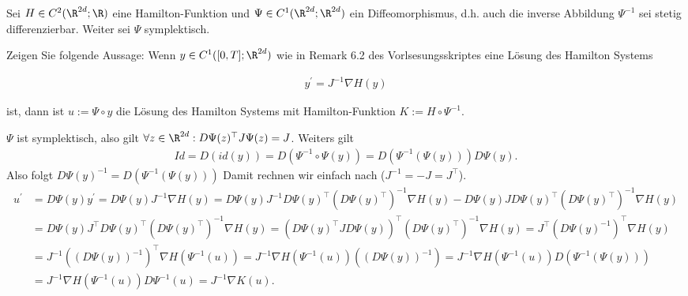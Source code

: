 \begin{exercise}
  Sei $H \in C^2(\R^{2d};\R)$ eine Hamilton-Funktion und
  $\Psi \in C^1(\R^{2d};\R^{2d})$ ein Diffeomorphismus,
  d.h. auch die inverse Abbildung $\Psi^{-1}$ sei stetig
  differenzierbar. Weiter sei $\Psi$ symplektisch.

  Zeigen Sie folgende Aussage: Wenn $y \in C^1([0,T];\R^{2d})$
  wie in Remark 6.2 des Vorlsesungsskriptes eine Lösung des
  Hamilton Systems

  \begin{align}
    y^\prime = J^{-1}\nabla H(y)
  \end{align}

  ist, dann ist $u := \Psi \circ y$ die Lösung des Hamilton
  Systems mit Hamilton-Funktion $K := H \circ \Psi^{-1}$.
\end{exercise}

\begin{solution}
  $\Psi$ ist symplektisch, also gilt $\forall z \in \R^{2d}: D\Psi(z)^{\top}J\Psi(z) = J$.
  Weiters gilt
  \begin{align*}
    Id = D(id(y)) = D(\Psi^{-1} \circ \Psi(y)) = D(\Psi^{-1}(\Psi(y)))D\Psi(y).
  \end{align*}
  Also folgt $D\Psi(y)^{-1} =  D(\Psi^{-1}(\Psi(y)))$
  Damit rechnen wir einfach nach ($J^{-1} = -J = J^{\top}$).
  \begin{align*}
    u^{\prime} &= D \Psi(y)y^{\prime} = D\Psi(y)J^{-1}\nabla H(y) =  D\Psi(y)J^{-1}D\Psi(y)^{\top}(D\Psi(y)^{\top})^{-1}\nabla H(y)
    -D\Psi(y)JD\Psi(y)^{\top}(D\Psi(y)^{\top})^{-1}\nabla H(y) \\
    &= D\Psi(y)J^{\top}D\Psi(y)^{\top}(D\Psi(y)^{\top})^{-1}\nabla H(y)
    = (D\Psi(y)^{\top}JD\Psi(y))^{\top}(D\Psi(y)^{\top})^{-1}\nabla H(y)
    = J^{\top}(D\Psi(y)^{-1})^{\top}\nabla H(y) \\
    &= J^{-1}((D\Psi(y))^{-1})^{\top}\nabla H(\Psi^{-1}(u))
    = J^{-1}\nabla H(\Psi^{-1}(u))((D\Psi(y))^{-1}) =
    J^{-1}\nabla H(\Psi^{-1}(u))D(\Psi^{-1}(\Psi(y))) \\
    &= J^{-1}\nabla H(\Psi^{-1}(u))D\Psi^{-1}(u) =  J^{-1}\nabla K(u).
  \end{align*}

\end{solution}
